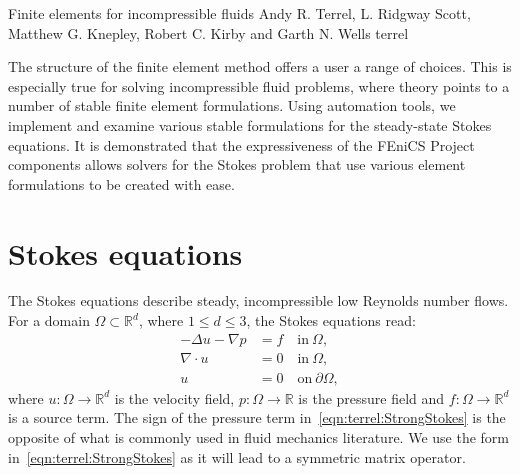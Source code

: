               {Finite elements for incompressible fluids}
              {Andy R. Terrel, L. Ridgway Scott, Matthew G. Knepley,
               Robert C. Kirby and Garth N. Wells}
              {terrel}


The structure of the finite element method offers a user a range of
choices.  This is especially true for solving incompressible fluid
problems, where theory points to a number of stable finite element
formulations. Using automation tools, we implement and examine various
stable formulations for the steady-state Stokes equations.  It is
demonstrated that the expressiveness of the FEniCS Project components
allows solvers for the Stokes problem that use various element
formulations to be created with ease.
\section{Stokes equations}
\label{sec:terrel:Stokes}

The Stokes equations describe steady, incompressible low Reynolds number
flows. For a domain $\Omega \subset \mathbb{R}^{d}$, where $1 \le d \le 3$,
the Stokes equations read:
%
\begin{align}
     -\Delta u - \nabla p &= f \quad \mbox{in} \ \Omega,
\label{eqn:terrel:StrongStokes}
\\
      \nabla\cdot u &= 0 \quad \mbox{in} \ \Omega,
\label{eqn:terrel:StrongStokes_icomp}
\\
      u &= 0 \quad \mbox{on} \  \partial \Omega,
\end{align}
%
where $u : \Omega \rightarrow \mathbb{R}^{d}$ is the velocity field,
$p : \Omega \rightarrow \mathbb{R}$ is the pressure field and $f :
\Omega \rightarrow \mathbb{R}^{d}$ is a source term. The sign of the
pressure term in~\eqref{eqn:terrel:StrongStokes} is the opposite of
what is commonly used in fluid mechanics literature. We use the form
in~\eqref{eqn:terrel:StrongStokes} as it will lead to a symmetric matrix
operator.

